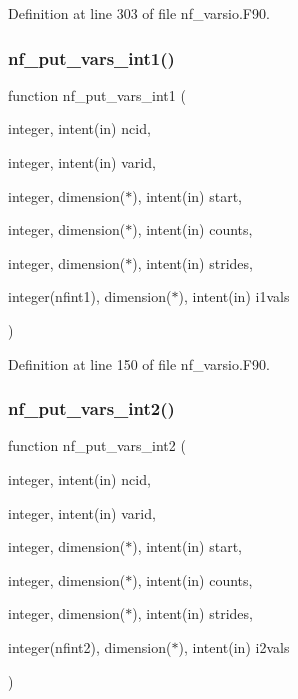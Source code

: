 Definition at line 303 of file nf\+\_\+varsio.\+F90.

\mbox{\label{nf__varsio_8F90_aeed2a4291a6875e72f437d266f2bbc90}} 
\subsubsection{\texorpdfstring{nf\+\_\+put\+\_\+vars\+\_\+int1()}{nf\_put\_vars\_int1()}}
{\footnotesize\ttfamily function nf\+\_\+put\+\_\+vars\+\_\+int1 (\begin{DoxyParamCaption}\item[{integer, intent(in)}]{ncid,  }\item[{integer, intent(in)}]{varid,  }\item[{integer, dimension($\ast$), intent(in)}]{start,  }\item[{integer, dimension($\ast$), intent(in)}]{counts,  }\item[{integer, dimension($\ast$), intent(in)}]{strides,  }\item[{integer(nfint1), dimension($\ast$), intent(in)}]{i1vals }\end{DoxyParamCaption})}



Definition at line 150 of file nf\+\_\+varsio.\+F90.

\mbox{\label{nf__varsio_8F90_a8bdeab8e74d82a72189d13dd200a72a0}} 
\subsubsection{\texorpdfstring{nf\+\_\+put\+\_\+vars\+\_\+int2()}{nf\_put\_vars\_int2()}}
{\footnotesize\ttfamily function nf\+\_\+put\+\_\+vars\+\_\+int2 (\begin{DoxyParamCaption}\item[{integer, intent(in)}]{ncid,  }\item[{integer, intent(in)}]{varid,  }\item[{integer, dimension($\ast$), intent(in)}]{start,  }\item[{integer, dimension($\ast$), intent(in)}]{counts,  }\item[{integer, dimension($\ast$), intent(in)}]{strides,  }\item[{integer(nfint2), dimension($\ast$), intent(in)}]{i2vals }\end{DoxyParamCaption})}



